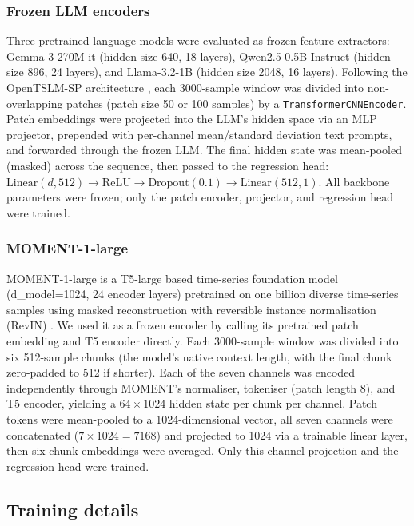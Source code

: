 \documentclass[10pt,twocolumn]{IEEEtran}
\begin{document}
\subsubsection{Frozen LLM encoders}
Three pretrained language models were evaluated as frozen feature
extractors:
Gemma-3-270M-it \cite{Team2024Gemma3} (hidden size 640, 18 layers),
Qwen2.5-0.5B-Instruct \cite{Hui2024Qwen25} (hidden size 896, 24 layers),
and Llama-3.2-1B \cite{Dubey2024Llama3} (hidden size 2048, 16 layers).
Following the OpenTSLM-SP architecture \cite{Zhou2023OneForAll},
each 3000-sample window was divided into non-overlapping patches
(patch size 50 or 100 samples) by a \texttt{TransformerCNNEncoder}.
Patch embeddings were projected into the LLM's hidden space via an
MLP projector, prepended with per-channel mean/standard deviation
text prompts, and forwarded through the frozen LLM.
The final hidden state was mean-pooled (masked) across the sequence,
then passed to the regression head:
$\text{Linear}(d, 512) \to \text{ReLU} \to \text{Dropout}(0.1) \to \text{Linear}(512, 1)$.
All backbone parameters were frozen; only the patch encoder,
projector, and regression head were trained.

\subsubsection{MOMENT-1-large}
MOMENT-1-large \cite{Goswami2024MOMENT} is a T5-large based
\cite{Raffel2020T5} time-series foundation model (d\_model=1024,
24 encoder layers) pretrained on one billion diverse time-series
samples using masked reconstruction with reversible instance
normalisation (RevIN) \cite{Luo2022RevIN}.
We used it as a frozen encoder by calling its pretrained patch
embedding and T5 encoder directly.
Each 3000-sample window was divided into six 512-sample chunks
(the model's native context length, with the final chunk
zero-padded to 512 if shorter).
Each of the seven channels was encoded independently through
MOMENT's normaliser, tokeniser (patch length 8), and T5 encoder,
yielding a $64 \times 1024$ hidden state per chunk per channel.
Patch tokens were mean-pooled to a 1024-dimensional vector,
all seven channels were concatenated ($7 \times 1024 = 7168$) and
projected to 1024 via a trainable linear layer, then six
chunk embeddings were averaged.
Only this channel projection and the regression head were trained.

\subsection{Training details}
\end{document}

